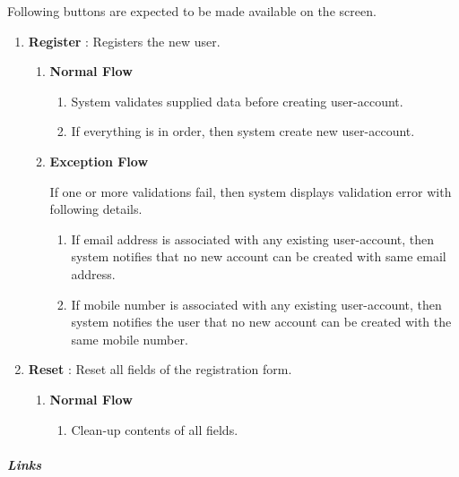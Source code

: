 \documentclass{article}%
\newcommand\margincomment[1]{\RaggedRight{\marginpar{\hsize1.7in\tiny\color{mccol}{#1}}}}%
\begin{document}
%
\par%
Following buttons are expected to be made available on the screen.%
\begin{enumerate}%
\item%
\hypertarget{ID:1572971016}{}%
\textbf{Register}%
: %
Registers the new user.%
\par%
\begin{enumerate}%
\item%
\hypertarget{ID:1542674567}{}%
\textbf{Normal Flow}%
%
\par%
\begin{enumerate}%
\item%
\hypertarget{ID:471928457}{}%
System validates supplied data before creating user{-}account.%
\par%
\item%
\hypertarget{ID:1249360283}{}%
If everything is in order, then system create new user{-}account.%
\par%
\end{enumerate}%
\item%
\hypertarget{ID:69944687}{}%
\textbf{Exception Flow}%
%
\par%
If one or more validations fail, then system displays validation error with following details.%
\begin{enumerate}%
\item%
\hypertarget{ID:1669244318}{}%
If email address is associated with any existing user{-}account, then system notifies that no new account can be created with same email address.%
\par%
\item%
\hypertarget{ID:1696597003}{}%
If mobile number is associated with any existing user{-}account, then system notifies the user that no new account can be created with the same mobile number.%
\par%
\end{enumerate}%
\end{enumerate}%
\item%
\hypertarget{ID:1737270551}{}%
\textbf{Reset}%
: %
Reset all fields of the registration form.%
\par%
\begin{enumerate}%
\item%
\hypertarget{ID:1022856176}{}%
\textbf{Normal Flow}%
%
\par%
\begin{enumerate}%
\item%
\hypertarget{ID:1807251594}{}%
Clean{-}up contents of all fields.%
\par%
\end{enumerate}%
\end{enumerate}%
\margincomment{\tiny{$\Lsh$ \hyperlink{ID:874678025}{Reset}}}%
\end{enumerate}%
\hypertarget{ID:1390704400}{}%
\subparagraph{Links}%
\end{document}
